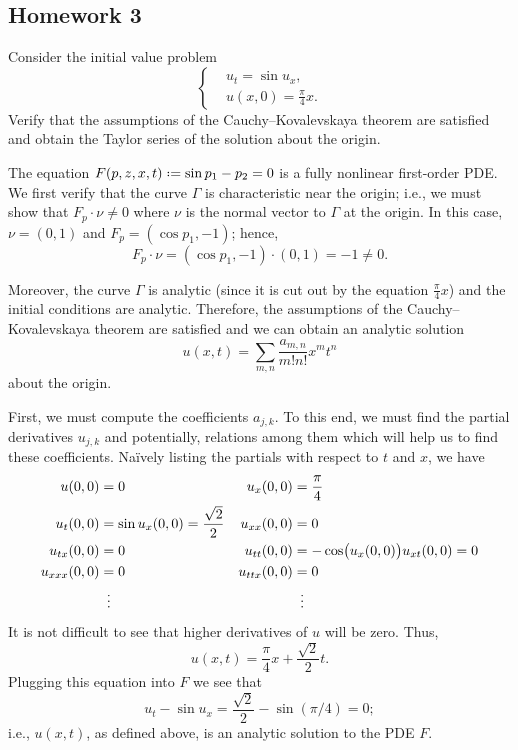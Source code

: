 \subsection{Homework 3}
\begin{problem}
  Consider the initial value problem
  \[
    \left\{
      \begin{aligned}
        &u_t=\sin u_x,\\
        &u(x,0)=\frac{\pi}{4}x.
      \end{aligned}
    \right.
  \]
  Verify that the assumptions of the Cauchy--Kovalevskaya theorem are
  satisfied and obtain the Taylor series of the solution about the origin.
\end{problem}
\begin{solution*}
  The equation \(F(p,z,x,t)\defeq\sin p_1-p_2=0\) is a fully nonlinear
  first-order PDE. We first verify that the curve \(\Gamma\) is
  characteristic near the origin; i.e., we must show that \(F_p\cdot\nu\neq
  0\) where \(\nu\) is the normal vector to \(\Gamma\) at the origin. In
  this case, \(\nu=(0,1)\) and \(F_p=(\cos p_1,-1)\); hence,
  \[
    F_p\cdot\nu= (\cos p_1,-1)\cdot(0,1)=-1\neq 0.
  \]

  Moreover, the curve \(\Gamma\) is analytic (since it is cut out by the
  equation \(\frac{\pi}{4}x\)) and the initial conditions are
  analytic. Therefore, the assumptions of the Cauchy--Kovalevskaya theorem
  are satisfied and we can obtain an analytic solution
  \[
    u(x,t)=\sum_{m,n}\frac{a_{m,n}}{m!n!}x^mt^n
  \]
  about the origin.

  First, we must compute the coefficients \(a_{j,k}\). To this end, we must
  find the partial derivatives \(u_{j,k}\) and potentially, relations among
  them which will help us to find these coefficients. Naïvely listing the
  partials with respect to \(t\) and \(x\), we have
  \begin{align*}
    u(0,0)&=0&
    u_x(0,0)&=\frac{\pi}{4}\\
    u_t(0,0)&=\sin u_x(0,0)=\frac{\sqrt{2}}{2}&
    u_{xx}(0,0)&=0\\
    u_{tx}(0,0)&=0&
    u_{tt}(0,0)&=-\cos\bigl(u_x(0,0)\bigr)u_{xt}(0,0)=0\\
    u_{xxx}(0,0)&=0&
    u_{ttx}(0,0)&=0\\
    &\vdotswithin{=}&&\vdotswithin{=}
  \end{align*}
  It is not difficult to see that higher derivatives of \(u\) will be
  zero. Thus,
  \[
    u(x,t)=\frac{\pi}{4}x+\frac{\sqrt{2}}{2}t.
  \]
  Plugging this equation into \(F\) we see that
  \[
    u_t-\sin u_x=\frac{\sqrt{2}}{2}-\sin(\pi/4)=0;
  \]
  i.e., \(u(x,t)\), as defined above, is an analytic solution to the PDE
  \(F\).
\end{solution*}

